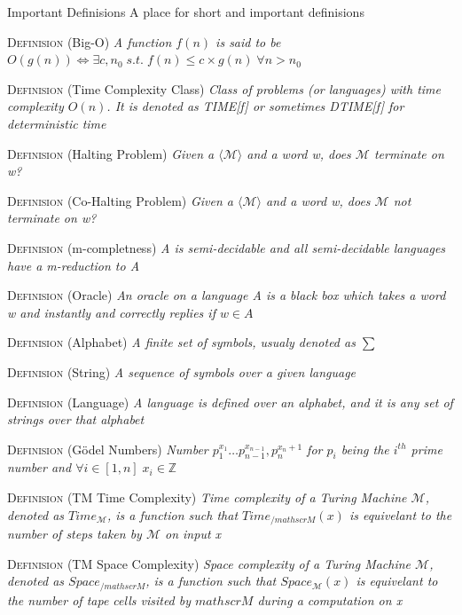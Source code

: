 \documentclass[12pt, letterpaper]{article}
\begin{document}
\begin{section}{Important Definisions}
  A place for short and important definisions

  \textsc{Definision} (Big-O) \textit{A function \(f(n)\) is said to be
    \(O(g(n))\iff \exists c, n_{0} \; s.t. \;
    f(n) \leq c \times g(n) \; \forall n > n_{0}\)}

  \textsc{Definision} (Time Complexity Class) \textit{Class of problems
    (or languages) with time complexity \(O(n)\). It is denoted as TIME[f] or
    sometimes DTIME[f] for deterministic time}

  \textsc{Definision} (Halting Problem) \textit{Given a
    \(\langle \mathscr{M} \rangle\) and a word w,
    does \(\mathscr{M}\) terminate on w?}

  \textsc{Definision} (Co-Halting Problem) \textit{Given a
    \(\langle \mathscr{M} \rangle\) and a word w,
    does \(\mathscr{M}\) not terminate on w?}

  \textsc{Definision} (m-completness) \textit{A is semi-decidable
    and all semi-decidable languages have a m-reduction to A}

  \textsc{Definision} (Oracle) \textit{An oracle on a language A is
    a black box which takes a word w and instantly and correctly
    replies if \(w \in A\)}

  \textsc{Definision} (Alphabet) \textit{A finite set of symbols,
    usualy denoted as \(\sum\)}

  \textsc{Definision} (String) \textit{A sequence of symbols over
    a given language}

  \textsc{Definision} (Language) \textit{A language is defined
    over an alphabet, and it is any set of strings over that alphabet}

  \textsc{Definision} (Gödel Numbers) \textit{Number
    \(p^{x_{1}}_{1} \dots p^{x_{n - 1}}_{n - 1}, p^{x_{n} + 1}_{n}\) for
    \(p_{i}\) being the \(i^{th}\) prime number and
  \(\forall i \in [1, n] \; x_{i} \in \mathbb{Z}\)}

  \textsc{Definision} (TM Time Complexity) \textit{Time complexity
    of a Turing Machine \(\mathscr{M}\), denoted as \(Time_{\mathscr{M}}\),
    is a function such that \(Time_{/mathscr{M}}(x)\) is equivelant to the
    number of steps taken by \(\mathscr{M}\) on input x}

  \textsc{Definision} (TM Space Complexity) \textit{Space complexity
    of a Turing Machine \(\mathscr{M}\), denoted as \(Space_{/mathscr{M}}\),
    is a function such that \(Space_{\mathscr{M}}(x)\) is equivelant to the
    number of tape cells visited by \(mathscr{M}\) during a computation on x}


\end{section}
\end{document}
